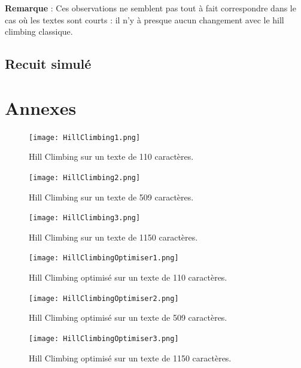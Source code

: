 \documentclass[a4paper]{article}
\begin{document}
\textbf{Remarque} : Ces observations ne semblent pas tout à fait correspondre dans le cas où les textes sont courts : il n'y à presque aucun changement avec le hill climbing classique.

\subsection{Recuit simulé}

\clearpage
\appendix
\section*{Annexes}
\label{sec:annexes}

\begin{figure}[H]
    \centering
    \texttt{[image: HillClimbing1.png]}
    \caption{Hill Climbing sur un texte de 110 caractères.}
    \label{fig:hill_110}
\end{figure}

\begin{figure}[H]
    \centering
    \texttt{[image: HillClimbing2.png]}
    \caption{Hill Climbing sur un texte de 509 caractères.}
    \label{fig:hill_509}
\end{figure}

\begin{figure}[H]
    \centering
    \texttt{[image: HillClimbing3.png]}
    \caption{Hill Climbing sur un texte de 1150 caractères.}
    \label{fig:hill_1150}
\end{figure}
\begin{figure}[H]
    \centering
    \texttt{[image: HillClimbingOptimiser1.png]}
    \caption{Hill Climbing optimisé sur un texte de 110 caractères.}
    \label{fig:hillopt_110}
\end{figure}

\begin{figure}[H]
    \centering
    \texttt{[image: HillClimbingOptimiser2.png]}
    \caption{Hill Climbing optimisé sur un texte de 509 caractères.}
    \label{fig:hillopt_509}
\end{figure}

\begin{figure}[H]
    \centering
    \texttt{[image: HillClimbingOptimiser3.png]}
    \caption{Hill Climbing optimisé sur un texte de 1150 caractères.}
    \label{fig:hillopt_1150}
\end{figure}
\end{document}
